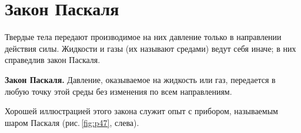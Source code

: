 \documentclass[main.tex]{subfiles}
\begin{document}

 

 

 
   

\section{Закон Паскаля}


Твердые тела передают производимое на них давление только в направлении действия силы. Жидкости и газы (их называют средами) ведут себя иначе; в них справедлив закон Паскаля. 
\begin{law}
\textbf{Закон Паскаля.} Давление, оказываемое на жидкость или газ, передается в любую точку этой
среды без изменения по всем направлениям.
\end{law}
Хорошей иллюстрацией этого закона служит опыт с прибором, называемым шаром Паскаля (рис.\,\ref{fig:p47}, слева).
\end{document}
